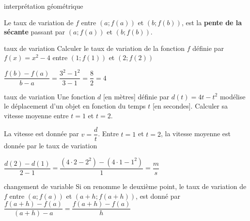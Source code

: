 \documentclass[a4paper,12pt]{article}
\begin{document}
\begin{remarque}
interprétation géométrique

	\tcblower
Le taux de variation de $f$ entre $(a;f(a))$ et $(b;f(b))$, est la \textbf{pente de la sécante} passant par $(a;f(a))$ et $(b;f(b))$.
\end{remarque}


\begin{exemple}
	taux de variation
	\tcblower
Calculer le taux de variation de la fonction $f$ définie par $f(x) = x^2 - 4$ entre $(1;f(1))$ et $(2;f(2))$

$\dfrac{f(b) - f(a)}{b - a} = \dfrac{3^2 - 1^2}{3 - 1} = \dfrac{8}{2} = 4$
\end{exemple}

\begin{exemple}
	taux de variation
	\tcblower
Une fonction $d$ [en mètres] définie par $d(t) = 4t - t^2$ modélise le déplacement d'un objet en fonction du temps $t$ [en secondes]. Calculer sa vitesse moyenne entre $t = 1$ et $t = 2$.

La vitesse est donnée par $v = \dfrac{d}{t}$. Entre $t = 1$ et $t = 2$, la vitesse moyenne est donnée par le taux de variation

$\dfrac{d(2) - d(1)}{2 - 1} = \dfrac{(4 \cdot 2 - 2^2) - (4 \cdot 1 - 1^2)}{1} = \dfrac{m}{s}$

\end{exemple}
\begin{remarque}
changement de variable
\tcblower
Si on renomme le deuxième point, le taux de variation de $f$ entre $(a;f(a))$ et $(a + h;f(a + h))$, est donné par $\dfrac{f(a + h) - f(a)}{(a + h) - a} = \dfrac{f(a + h) - f(a)}{h}$
\end{remarque}
\end{document}
